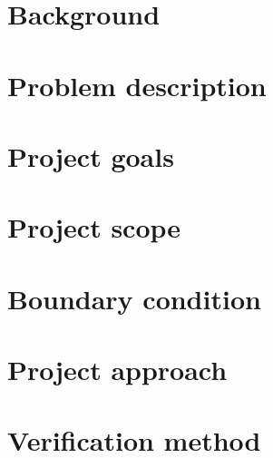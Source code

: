 \section{Background}

\section{Problem description}

\section{Project goals}

\section{Project scope}

\section{Boundary condition}

\section{Project approach}

\section{Verification method}

